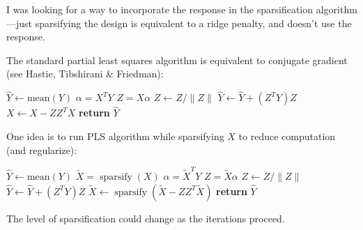 \documentclass[12pt]{imsart}
\numberwithin{equation}{section}
\theoremstyle{plain}
\theoremstyle{remark}
\let\hat\widehat
\let\tilde\widetilde
\let\hat\widehat
\let\tilde\widetilde
\let\hat\widehat
\let\hat\widehat
\let\tilde\widetilde
\def\sparsify{\mathop{\mbox{sparsify}}}
\def\Xs{\tilde X}
\begin{document}
\begin{frontmatter}
\end{frontmatter}

\par


I was looking for a way to incorporate the response in the
sparsification algorithm---just sparsifying the design
is equivalent to a ridge penalty, and doesn't use the response.


The standard partial least squares algorithm is equivalent to
conjugate gradient (see Hastie, Tibshirani \& Friedman):

\begin{center}
\begin{minipage}{.5\columnwidth}
\begin{algorithmic}[1]
   \State $\hat Y \gets \text{mean}(Y)$
      \State $\alpha = X^T Y$
      \State $Z = X\alpha$
      \State $Z\gets Z / \|Z\|$
      \State $\hat Y \gets \hat Y + (Z^T Y) Z$
      \State $X \gets X - Z Z^T X$
   \EndFor
   \State \textbf{return} $\hat Y$
\EndProcedure
\end{algorithmic}
\end{minipage}
\end{center}

One idea is to run PLS algorithm while sparsifying $X$
to reduce computation (and regularize):
\begin{center}
\begin{minipage}{.5\columnwidth}
\begin{algorithmic}[1]
   \State $\hat Y \gets \text{mean}(Y)$
   \State $\Xs = \sparsify(X)$
      \State $\alpha = \Xs^T Y$
      \State $Z = \Xs \alpha$
      \State $Z\gets Z / \|Z\|$
      \State $\hat Y \gets \hat Y + (Z^T Y) Z$
      \State $\Xs \gets \sparsify(\Xs - Z Z^T \Xs)$
   \EndFor
   \State \textbf{return} $\hat Y$
\EndProcedure
\end{algorithmic}
\end{minipage}
\end{center}
The level of sparsification could change
as the iterations proceed.  
\end{document}
